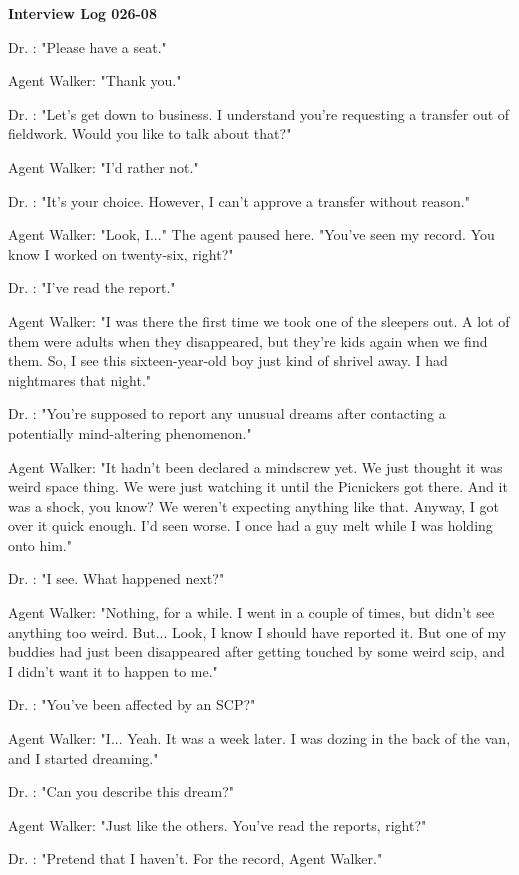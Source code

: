 \textbf{Interview Log 026-08}

Dr. : "Please have a seat."

Agent Walker: "Thank you."

Dr. : "Let's get down to business. I understand you're requesting a transfer out of fieldwork. Would you like to talk about that?"

Agent Walker: "I'd rather not."

Dr. : "It's your choice. However, I can't approve a transfer without reason."

Agent Walker: "Look, I..." The agent paused here. "You've seen my record. You know I worked on twenty-six, right?"

Dr. : "I've read the report."

Agent Walker: "I was there the first time we took one of the sleepers out. A lot of them were adults when they disappeared, but they're kids again when we find them. So, I see this sixteen-year-old boy just kind of shrivel away. I had nightmares that night."

Dr. : "You're supposed to report any unusual dreams after contacting a potentially mind-altering phenomenon."

Agent Walker: "It hadn't been declared a mindscrew yet. We just thought it was weird space thing. We were just watching it until the Picnickers got there. And it was a shock, you know? We weren't expecting anything like that. Anyway, I got over it quick enough. I'd seen worse. I once had a guy melt while I was holding onto him."

Dr. : "I see. What happened next?"

Agent Walker: "Nothing, for a while. I went in a couple of times, but didn't see anything too weird. But... Look, I know I should have reported it. But one of my buddies had just been disappeared after getting touched by some weird scip, and I didn't want it to happen to me."

Dr. : "You've been affected by an SCP?"

Agent Walker: "I... Yeah. It was a week later. I was dozing in the back of the van, and I started dreaming."

Dr. : "Can you describe this dream?"

Agent Walker: "Just like the others. You've read the reports, right?"

Dr. : "Pretend that I haven't. For the record, Agent Walker."

